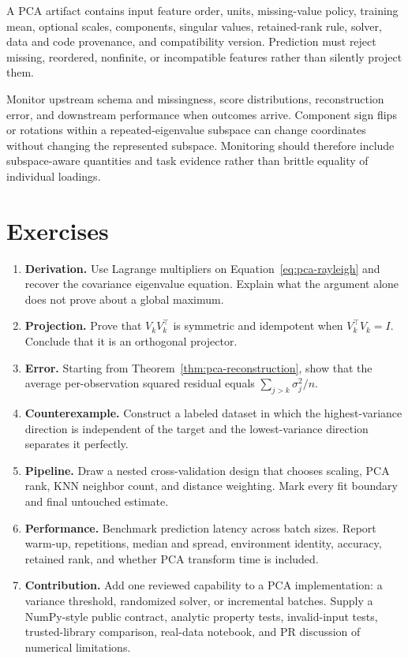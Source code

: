 A PCA artifact contains input feature order, units, missing-value policy,
training mean, optional scales, components, singular values, retained-rank
rule, solver, data and code provenance, and compatibility version. Prediction
must reject missing, reordered, nonfinite, or incompatible features rather than
silently project them.

Monitor upstream schema and missingness, score distributions, reconstruction
error, and downstream performance when outcomes arrive. Component sign flips
or rotations within a repeated-eigenvalue subspace can change coordinates
without changing the represented subspace. Monitoring should therefore include
subspace-aware quantities and task evidence rather than brittle equality of
individual loadings.

\section{Exercises}
\begin{enumerate}
  \item \textbf{Derivation.} Use Lagrange multipliers on
  Equation~\eqref{eq:pca-rayleigh} and recover the covariance eigenvalue equation.
  Explain what the argument alone does not prove about a global maximum.
  \item \textbf{Projection.} Prove that $V_kV_k^\top$ is symmetric and idempotent
  when $V_k^\top V_k=I$. Conclude that it is an orthogonal projector.
  \item \textbf{Error.} Starting from Theorem~\ref{thm:pca-reconstruction}, show
  that the average per-observation squared residual equals
  $\sum_{j>k}\sigma_j^2/n$.
  \item \textbf{Counterexample.} Construct a labeled dataset in which the
  highest-variance direction is independent of the target and the
  lowest-variance direction separates it perfectly.
  \item \textbf{Pipeline.} Draw a nested cross-validation design that chooses
  scaling, PCA rank, KNN neighbor count, and distance weighting. Mark every fit
  boundary and final untouched estimate.
  \item \textbf{Performance.} Benchmark prediction latency across batch sizes.
  Report warm-up, repetitions, median and spread, environment identity, accuracy,
  retained rank, and whether PCA transform time is included.
  \item \textbf{Contribution.} Add one reviewed capability to a PCA implementation:
  a variance threshold, randomized solver, or incremental batches. Supply a
  NumPy-style public contract, analytic property tests, invalid-input tests,
  trusted-library comparison, real-data notebook, and PR discussion of numerical
  limitations.
\end{enumerate}

